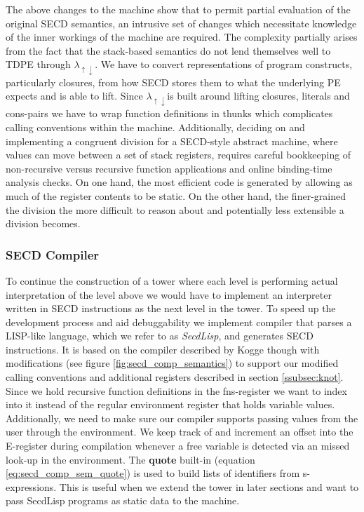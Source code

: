 \documentclass[a4paper,12pt,twoside,openright]{report}
\theoremstyle{definition}
\newcommand{\mslang}{$\lambda_{\uparrow\downarrow}$}
\newcommand{\secdlisp}{SecdLisp}
\begin{document}
The above changes to the machine show that to permit partial evaluation of the original SECD semantics, an intrusive set of changes which necessitate knowledge of the inner workings of the machine are required. The complexity partially arises from the fact that the stack-based semantics do not lend themselves well to TDPE through \mslang. We have to convert representations of program constructs, particularly closures, from how SECD stores them to what the underlying PE expects and is able to lift. Since \mslang is built around lifting closures, literals and cons-pairs we have to wrap function definitions in thunks which complicates calling conventions within the machine. Additionally, deciding on and implementing a congruent division for a SECD-style abstract machine, where values can move between a set of stack registers, requires careful bookkeeping of non-recursive versus recursive function applications and online binding-time analysis checks. On one hand, the most efficient code is generated by allowing as much of the register contents to be static. On the other hand, the finer-grained the division the more difficult to reason about and potentially less extensible a division becomes.

\subsubsection{SECD Compiler}\label{subsec:secd_comp}
To continue the construction of a tower where each level is performing actual interpretation of the level above we would have to implement an interpreter written in SECD instructions as the next level in the tower. To speed up the development process and aid debuggability we implement compiler that parses a LISP-like language, which we refer to as \textit{\secdlisp{}}, and generates SECD instructions. It is based on the compiler described by Kogge \cite{kogge1990architecture} though with modifications (see figure \ref{fig:secd_comp_semantics}) to support our modified calling conventions and additional registers described in section \ref{ssubsec:knot}. Since we hold recursive function definitions in the fns-register we want to index into it instead of the regular environment register that holds variable values. Additionally, we need to make sure our compiler supports passing values from the user through the environment. We keep track of and increment an offset into the E-register during compilation whenever a free variable is detected via an missed look-up in the environment. The \textbf{quote} built-in (equation \ref{eq:secd_comp_sem_quote}) is used to build lists of identifiers from s-expressions. This is useful when we extend the tower in later sections and want to pass \secdlisp{} programs as static data to the machine.
\end{document}
